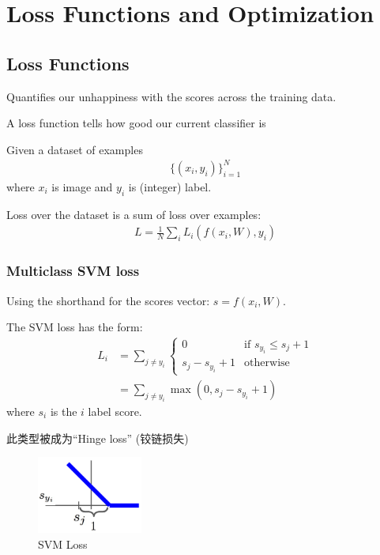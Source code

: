 \newpage
\section{Loss Functions and Optimization}
\subsection{Loss Functions}
Quantifies our unhappiness with the scores across the training data.

A loss function tells how good our current classifier is

Given a dataset of examples
\begin{align*}
    \{ (x_i, y_i) \}_{i=1}^N
\end{align*}
where $x_i$ is image and $y_i$ is (integer) label. 

Loss over the dataset is a sum of loss over examples:
\begin{align*}
    L=\frac{1}{N}\sum_i L_i (f(x_i, W), y_i)
\end{align*}

\subsubsection{Multiclass SVM loss}
Using the shorthand for the scores vector: $s=f(x_i, W)$. 

The SVM loss has the form:
\begin{align*}
    L_i&=\sum_{j\ne y_i}\left\{ \begin{array}{ll}
        0 & \text{if }s_{y_i}\le s_j+1\\
        s_j-s_{y_i}+1 & \text{otherwise}
    \end{array} \right.\\
    &=\sum_{j\ne y_i}\max(0, s_j-s_{y_i}+1)
\end{align*}
where $s_i$ is the $i$ label score.

此类型被成为``Hinge loss'' (铰链损失)

\begin{figure}[!htb]
    \centering
    \includegraphics[width=0.309\textwidth]{pic/Lec3/SVM loss.png}
    \caption{SVM Loss}
\end{figure}

